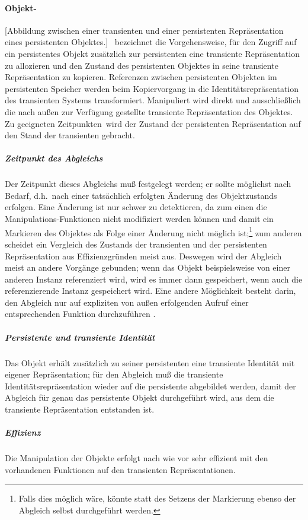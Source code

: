 \paragraph{Objekt-\protect\swizzling}%
%
[Abbildung zwischen einer transienten
und einer persistenten Repr\"{a}sentation eines persistenten Objektes.]%
%
\swizzling\ bezeichnet die Vorgehensweise, f\"{u}r den Zugriff
auf ein persistentes Objekt zus\"{a}tzlich zur persistenten eine
transiente Repr\"{a}sentation zu allozieren und den Zustand des
persistenten Objektes in seine transiente Repr\"{a}sentation zu
kopieren. Referenzen zwischen persistenten Objekten im persistenten
Speicher werden beim Kopiervorgang in die Identit\"{a}tsrepr\"{a}sentation
des transienten Systems transformiert. Manipuliert wird direkt und
aus\-schlie\ss{}\-lich die nach au\ss{}en zur Verf\"{u}gung gestellte
transiente Repr\"{a}sentation des Objektes. Zu \rglq{}geeigneten
Zeitpunkten\rgrq\ wird der Zustand der persistenten Repr\"{a}sentation auf
den Stand der transienten gebracht.
%
\subparagraph{Zeitpunkt des Abgleichs}%
%
Der Zeitpunkt dieses Abgleichs mu\ss{} festgelegt werden; er sollte
m\"{o}glichst nach Bedarf, d.h.\ nach einer tats\"{a}chlich erfolgten
\"{A}nderung des Objektzustands erfolgen. Eine \"{A}nderung ist nur schwer
zu detektieren, da zum einen die Manipulations-Funktionen nicht
modifiziert werden k\"{o}nnen und damit ein Markieren des Objektes als
Folge einer \"{A}nderung nicht m\"{o}glich ist;\footnote{Falls dies m\"{o}glich
w\"{a}re, k\"{o}nnte statt des Setzens der Markierung ebenso der Abgleich
selbst durchgef\"{u}hrt werden.} zum anderen scheidet ein Vergleich des
Zustands der transienten und der persistenten Repr\"{a}sentation aus
Effizienzgr\"{u}nden meist aus. Deswegen wird der Abgleich meist an
andere Vorg\"{a}nge gebunden; wenn das Objekt beispielsweise von einer
anderen Instanz referenziert wird, wird es immer dann gespeichert,
wenn auch die referenzierende Instanz gespeichert wird. Eine andere
M\"{o}glichkeit besteht darin, den Abgleich nur auf expliziten von au\ss{}en
erfolgenden Aufruf einer entsprechenden Funktion durchzuf\"{u}hren
\cite[]{bib:ca88}.
%
\subparagraph{Persistente und transiente Identit\"{a}t}%
%
Das Objekt erh\"{a}lt zus\"{a}tzlich zu seiner persistenten
eine transiente Identit\"{a}t mit eigener Repr\"{a}sentation; f\"{u}r den
Abgleich mu\ss{} die transiente Identit\"{a}tsrepr\"{a}sentation wieder auf die
persistente abgebildet werden, damit der Abgleich f\"{u}r genau das
persistente Objekt durchgef\"{u}hrt wird, aus dem die transiente
Repr\"{a}sentation entstanden ist.
%
\subparagraph{Effizienz}%
%
Die Manipulation der Objekte erfolgt nach wie vor sehr effizient
mit den vorhandenen Funktionen auf den transienten Repr\"{a}sentationen.
%
